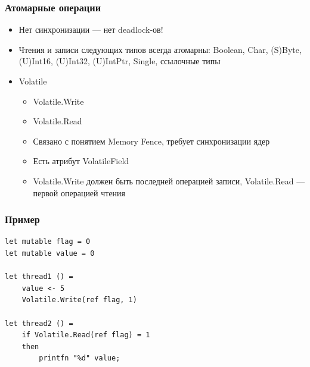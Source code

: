 \documentclass[xetex,mathserif,serif]{beamer}
\begin{document}
    \begin{frame}
        \frametitle{Атомарные операции}
        \begin{itemize}
            \item Нет синхронизации --- нет deadlock-ов!
            \item Чтения и записи следующих типов всегда атомарны: Boolean, Char, (S)Byte, (U)Int16, (U)Int32, (U)IntPtr, Single, ссылочные типы
            \item Volatile
            \begin{itemize}
                \item Volatile.Write
                \item Volatile.Read
                \item Связано с понятием Memory Fence, требует синхронизации ядер
                \item Есть атрибут VolatileField
                \item Volatile.Write должен быть последней операцией записи, Volatile.Read --- первой операцией чтения
            \end{itemize}
        \end{itemize}
    \end{frame}

    \begin{frame}[fragile]
        \frametitle{Пример}
        \begin{verbatim}
let mutable flag = 0
let mutable value = 0

let thread1 () = 
    value <- 5
    Volatile.Write(ref flag, 1)

let thread2 () =
    if Volatile.Read(ref flag) = 1 
    then
        printfn "%d" value;
        \end{verbatim}
    \end{frame}
\end{document}
